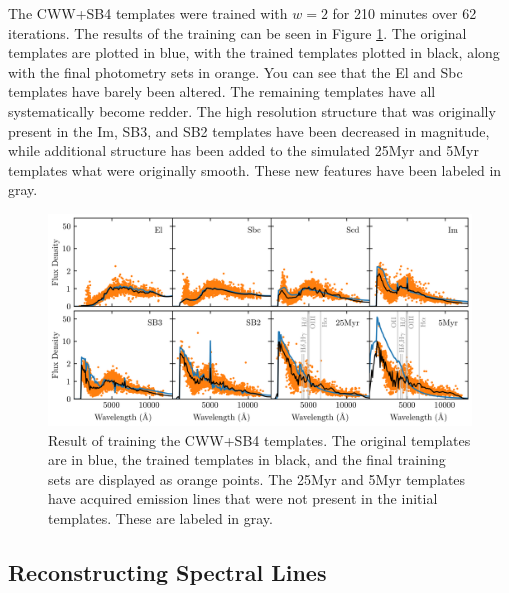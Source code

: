 The CWW+SB4 templates were trained with $w=2$ for 210 minutes over 62 iterations.
The results of the training can be seen in Figure \ref{fig:cwwsb4_trained}.
The original templates are plotted in blue, with the trained templates plotted in black, along with the final photometry sets in orange.
You can see that the El and Sbc templates have barely been altered. The remaining templates have all systematically become redder.
The high resolution structure that was originally present in the Im, SB3, and SB2 templates have been decreased in magnitude, while additional structure has been added to the simulated 25Myr and 5Myr templates what were originally smooth.
These new features have been labeled in gray.

\begin{figure}
    \centering
    \includegraphics{figures/cwwsb4_trained.png}
    \caption{Result of training the CWW+SB4 templates. The original templates are in blue, the trained templates in black, and the final training sets are displayed as orange points. The 25Myr and 5Myr templates have acquired emission lines that were not present in the initial templates. These are labeled in gray.}
    \label{fig:cwwsb4_trained}
\end{figure}



\subsection{Reconstructing Spectral Lines}
\label{sect:speclines}

